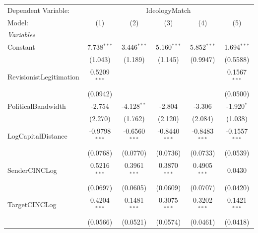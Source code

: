 
\begingroup
\centering
\begin{tabular}{lccccc}
   \tabularnewline \midrule \midrule
   Dependent Variable: & \multicolumn{5}{c}{IdeologyMatch}\\
   Model:                                                    & (1)             & (2)             & (3)             & (4)             & (5)\\  
   \midrule
   \emph{Variables}\\
   Constant                                                  & 7.738$^{***}$   & 3.446$^{***}$   & 5.160$^{***}$   & 5.852$^{***}$   & 1.694$^{***}$\\   
                                                             & (1.043)         & (1.189)         & (1.145)         & (0.9947)        & (0.5588)\\   
   RevisionistLegitimation                                   & 0.5209$^{***}$  &                 &                 &                 & 0.1567$^{***}$\\   
                                                             & (0.0942)        &                 &                 &                 & (0.0500)\\   
   PoliticalBandwidth                                        & -2.754          & -4.128$^{**}$   & -2.804          & -3.306          & -1.920$^{*}$\\   
                                                             & (2.270)         & (1.762)         & (2.120)         & (2.084)         & (1.038)\\   
   LogCapitalDistance                                        & -0.9798$^{***}$ & -0.6560$^{***}$ & -0.8440$^{***}$ & -0.8483$^{***}$ & -0.1557$^{***}$\\   
                                                             & (0.0768)        & (0.0770)        & (0.0736)        & (0.0733)        & (0.0539)\\   
   SenderCINCLog                                             & 0.5216$^{***}$  & 0.3961$^{***}$  & 0.3870$^{***}$  & 0.4905$^{***}$  & 0.0430\\   
                                                             & (0.0697)        & (0.0605)        & (0.0609)        & (0.0707)        & (0.0420)\\   
   TargetCINCLog                                             & 0.4204$^{***}$  & 0.1481$^{***}$  & 0.3075$^{***}$  & 0.3202$^{***}$  & 0.1421$^{***}$\\   
                                                             & (0.0566)        & (0.0521)        & (0.0574)        & (0.0461)        & (0.0418)\\   

\end{tabular}
